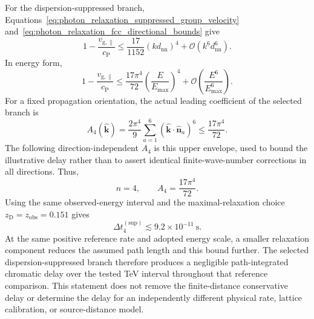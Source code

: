 For the dispersion-suppressed branch,
Equations~\eqref{eq:photon_relaxation_suppressed_group_velocity}
and~\eqref{eq:photon_relaxation_fcc_directional_bounds} give
\begin{equation}
    1
    -
    \frac{
        v_{\mathrm{g},\parallel}
    }{
        c_{\mathrm P}
    }
    \leq
    \frac{
        17
    }{
        1152
    }
    \left(
        kd_{\mathrm{nn}}
    \right)^4
    +
    \mathcal{O}
    \left(
        k^6d_{\mathrm{nn}}^6
    \right).
    \label{eq:photon_relaxation_suppressed_upper_bound}
\end{equation}
In energy form,
\begin{equation}
    1
    -
    \frac{
        v_{\mathrm{g},\parallel}
    }{
        c_{\mathrm P}
    }
    \leq
    \frac{
        17\pi^4
    }{
        72
    }
    \left(
        \frac{
            E
        }{
            E_{\mathrm{max}}
        }
    \right)^4
    +
    \mathcal{O}
    \left(
        \frac{
            E^6
        }{
            E_{\mathrm{max}}^6
        }
    \right).
    \label{eq:photon_relaxation_suppressed_energy_bound}
\end{equation}
For a fixed propagation orientation, the actual leading coefficient of the
selected branch is
\[
    A_4(\widehat{\mathbf k})
    =\frac{2\pi^4}{9}
      \sum_{a=1}^{6}
       (\widehat{\mathbf k}\cdot\widehat{\mathbf n}_a)^6
    \leq\frac{17\pi^4}{72}.
\]
The following direction-independent \(A_4\) is this upper envelope, used to
bound the illustrative delay rather than to assert identical
finite-wave-number corrections in all directions. Thus,
\begin{equation}
    n
    =
    4,
    \qquad
    A_4
    =
    \frac{
        17\pi^4
    }{
        72
    }.
    \label{eq:photon_relaxation_suppressed_delay_coefficient}
\end{equation}
Using the same observed-energy interval and the maximal-relaxation choice
\(z_{\mathrm D}=z_{\mathrm{obs}}=0.151\) gives
\begin{equation}
    \Delta t_4^{(\mathrm{sup})}
    \lesssim
    9.2
    \times
    10^{-11}
    \ \mathrm{s}.
    \label{eq:photon_relaxation_suppressed_integrated_delay}
\end{equation}
At the same positive reference rate and adopted energy scale, a smaller
relaxation component reduces the assumed path length and this bound further.
The selected dispersion-suppressed branch therefore produces a negligible
path-integrated chromatic delay over the tested TeV interval throughout that
reference comparison. This statement does not remove the finite-distance
conservative delay or determine the delay for an independently different
physical rate, lattice calibration, or source-distance model.

